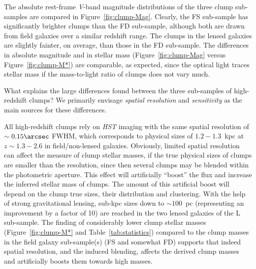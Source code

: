 \documentclass[twocolumn]{aastex61}
\begin{document}
The absolute rest-frame {\it V}-band magnitude distributions of the three clump 
sub-samples are compared in Figure~\ref{fig:clump-Mag}. Clearly, the FS 
sub-sample has significantly brighter clumps than the FD sub-sample, although 
both are drawn from field galaxies over a similar redshift range. The clumps in 
the lensed galaxies are slightly fainter, on average, than those in the FD 
sub-sample. The differences in absolute magnitude and in stellar mass 
(Figure~\ref{fig:clump-Mag} versus Figure~\ref{fig:clump-M*}) are comparable, as 
expected, since the optical light traces stellar mass if the mass-to-light ratio 
of clumps does not vary much.

What explains the large differences found between the three sub-samples of 
high-redshift clumps? We primarily envisage {\em spatial resolution} and 
{\em sensitivity} as the main sources for these differences. 

All high-redshift clumps rely on {\it HST} imaging with the same spatial 
resolution of $\sim 0.15\arcsec$ FWHM, which corresponds to physical sizes of 
$1.2-1.3$~kpc at $z\sim 1.3-2.6$ in field/non-lensed galaxies.
Obviously, limited spatial resolution can affect the measure of clump stellar 
masses, if the true physical sizes of clumps are smaller than the resolution, 
since then several clumps may be blended within the photometric aperture. This 
effect will artificially ``boost'' the flux and increase the inferred stellar 
mass of clumps. The amount of this artificial boost will depend on the clump 
true sizes, their distribution and clustering. 
With the help of strong gravitational lensing,
sub-kpc sizes down to $\sim 100$~pc (representing an improvement by a factor of 
10) are reached 
in the two lensed galaxies of the L sub-sample.
The finding of considerably lower clump stellar masses 
(Figure~\ref{fig:clump-M*} and Table~\ref{tab:statistics}) compared to the 
clump masses in the field galaxy sub-sample(s) (FS and somewhat FD) supports 
that indeed spatial resolution, and the induced blending, affects the derived 
clump masses and artificially boosts them towards high masses. 
\end{document}
